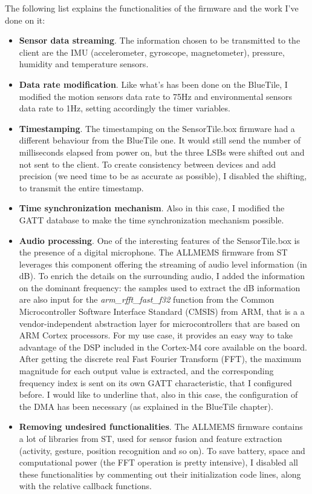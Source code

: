 The following list explains the functionalities of the firmware and the work I've done on it:
\begin{itemize}
    \item \textbf{Sensor data streaming}. The information chosen to be transmitted to the client are the IMU (accelerometer, gyroscope, magnetometer), pressure, humidity and temperature sensors. 
    \item \textbf{Data rate modification}. Like what's has been done on the BlueTile, I modified the motion sensors data rate to 75Hz and environmental sensors data rate to 1Hz, setting accordingly the timer variables. 
    \item \textbf{Timestamping}. The timestamping on the SensorTile.box firmware had a different behaviour from the BlueTile one. It would still send the number of milliseconds elapsed from power on, but the three LSBs were shifted out and not sent to the client. To create consistency between devices and add precision (we need time to be as accurate as possible), I disabled the shifting, to transmit the entire timestamp. 
    \item \textbf{Time synchronization mechanism}. Also in this case, I modified the GATT database to make the time synchronization mechanism possible. 
    \item \textbf{Audio processing}. One of the interesting features of the SensorTile.box is the presence of a digital microphone. The ALLMEMS firmware from ST leverages this component offering the streaming of audio level information (in dB). To enrich the details on the surrounding audio, I added the information on the dominant frequency: the samples used to extract the dB information are also input for the \textit{arm\_rfft\_fast\_f32} function from the Common Microcontroller Software Interface Standard (CMSIS) from ARM, that is a a vendor-independent abstraction layer for microcontrollers that are based on ARM Cortex processors. For my use case, it provides an easy way to take advantage of the DSP included in the Cortex-M4 core available on the board. After getting the discrete real Fast Fourier Transform (FFT), the maximum magnitude for each output value is extracted, and the corresponding frequency index is sent on its own GATT characteristic, that I configured before.  
    I would like to underline that, also in this case, the configuration of the DMA has been necessary (as explained in the BlueTile chapter). 
    \item \textbf{Removing undesired functionalities}. The ALLMEMS firmware contains a lot of libraries from ST, used for sensor fusion and feature extraction (activity, gesture, position recognition and so on). To save battery, space and computational power (the FFT operation is pretty intensive), I disabled all these functionalities by commenting out their initialization code lines, along with the relative callback functions.  
\end{itemize}

